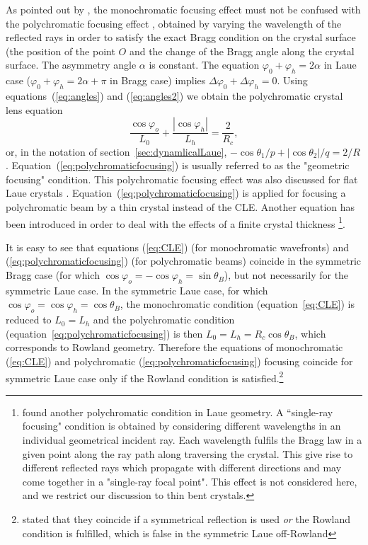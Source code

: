 \documentclass[preprint]{iucr}              %
\begin{document}
As pointed out by \cite{CK}, the monochromatic focusing effect must not be confused with the polychromatic focusing effect \cite{handbook,Schulze1998,Martinson}, obtained by varying the wavelength of the reflected rays in order to satisfy the exact Bragg condition on the crystal surface (the position of the point $O$ and the change of the Bragg angle along the crystal surface. The asymmetry angle $\alpha$ is constant. The equation $\varphi_0+\varphi_h=2\alpha$ in Laue case ($\varphi_0+\varphi_h=2\alpha+\pi$ in Bragg case) implies $\Delta\varphi_0+\Delta\varphi_h=0$. Using equations~(\ref{eq:angles}) and  (\ref{eq:angles2}) we obtain the polychromatic crystal lens equation
\begin{equation}
\label{eq:polychromaticfocusing}
\frac{{\cos {\varphi _o}}}{{{L_0}}} + \frac{{\left| {\cos {\varphi _h}} \right|}}{{{L_h}}} = \frac{2}{R_c},
\end{equation}
or, in the notation of section~\ref{sec:dynamlicalLaue}, $-\cos\theta_1/p + |\cos\theta_2|/q=2/R$. Equation~(\ref{eq:polychromaticfocusing}) is usually referred to as the "geometric focusing" condition. This polychromatic focusing effect was also discussed for flat Laue crystals \cite{sanchezdelrio1994}. Equation~(\ref{eq:polychromaticfocusing}) is applied for focusing a polychromatic beam by a thin crystal instead of the CLE. Another equation has been introduced in order to deal with the effects of a finite crystal thickness \cite{PengQi}\footnote{\cite{PengQi} found another polychromatic condition in Laue geometry. A ``single-ray focusing" condition is obtained by considering different wavelengths in an individual geometrical incident ray. Each wavelength fulfils the Bragg law in a given point along the ray path along traversing the crystal. This give rise to different reflected rays which propagate with different directions and may come together in a "single-ray focal point". This effect is not considered here, and we restrict our discussion to thin bent crystals. }.


It is easy to see that equations (\ref{eq:CLE}) (for monochromatic wavefronts) and (\ref{eq:polychromaticfocusing}) (for polychromatic beams) coincide in the symmetric Bragg case (for which $\cos\varphi_o=-\cos\varphi_h=\sin\theta_B$), but not necessarily for the symmetric Laue case. In the symmetric Laue case, for which $\cos\varphi_o=\cos\varphi_h=\cos\theta_B$, the monochromatic condition (equation~\ref{eq:CLE}) is reduced to $L_0=L_h$ and the polychromatic condition (equation~\ref{eq:polychromaticfocusing}) is then $L_0=L_h=R_c\cos\theta_B$, which corresponds to Rowland geometry. Therefore the equations of monochromatic (\ref{eq:CLE}) and polychromatic (\ref{eq:polychromaticfocusing}) focusing coincide for symmetric Laue case only if the Rowland condition is satisfied.\footnote{\cite{CK} stated that they coincide if a symmetrical reflection is used {\it or} the Rowland condition is fulfilled, which is false in the symmetric Laue off-Rowland}
\end{document}
